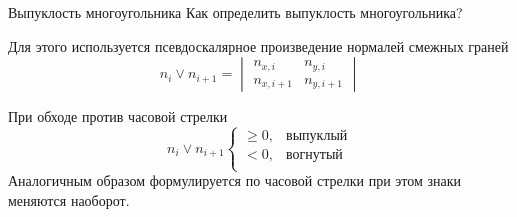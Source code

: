 \documentclass{beamer}
\begin{document}
\begin{frame}{Выпуклость многоугольника}
	Как определить выпуклость многоугольника?

	Для этого используется псевдоскалярное произведение нормалей смежных граней
	\[
		n_i \lor n_{i+1}
		=
		\begin{vmatrix} n_{x,i} & n_{y,i} \\ n_{x,i+1} & n_{y,i+1} \end{vmatrix}
	\]

	При обходе против часовой стрелки
	\[
		n_i \lor n_{i+1}
		\begin{cases}
			\geqslant	0, & \text{выпуклый} \\
			<	0, & \text{вогнутый} \\
		\end{cases}
	\]
	Аналогичным образом формулируется по часовой стрелки при этом знаки меняются наоборот.

	\end{frame}
\end{document}
